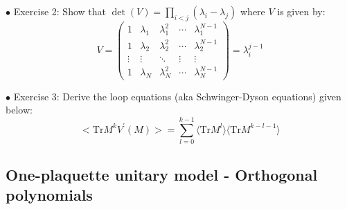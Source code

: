 \documentclass[11pt]{article}
\begin{document}
\vspace{5mm} 
\begin{mdframed}[backgroundcolor=blue!3] 
	\textsc{} 
	$\bullet$ Exercise 2: Show that $\det(V) = \prod_{i<j} (\lambda_i - \lambda_j)$ where $V$ is given by: 
	\begin{equation*}
		V = 
		\begin{pmatrix}
			1 & \lambda_1 & \lambda_{1}^{2} & \cdots & \lambda_{1}^{N-1} \\
			1 & \lambda_2 & \lambda_{2}^{2} & \cdots & \lambda_{2}^{N-1} \\ 
			\vdots  & \vdots  & \ddots & \vdots  & \vdots \\
			1 & \lambda_N & \lambda_{N}^{2} & \cdots & \lambda_{N}^{N-1} 
		\end{pmatrix} = \lambda_{i}^{j-1} 
	\end{equation*}
	
\end{mdframed} 

\begin{mdframed}[backgroundcolor=blue!3] 
	\textsc{} 
	$\bullet$ Exercise 3: Derive the loop equations (aka Schwinger-Dyson equations) given below: \\ 
	\begin{equation}
		\label{eq:LE1} 
		\Big< \mbox{Tr} M^{k} V^{\prime}(M) \Big> = \sum_{l=0}^{k-1} \langle \mbox{Tr} M^{l} \rangle  \langle \mbox{Tr} M^{k-l-1} \rangle
	\end{equation} 
\end{mdframed}

\subsection{One-plaquette unitary model - Orthogonal polynomials} 
\end{document}
